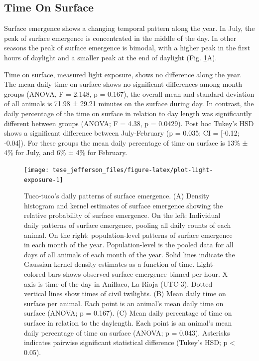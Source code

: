\documentclass[msc,numbers,hidelinks]{coppe}
\begin{document}
  \hypertarget{time-on-surface}{%
  \subsection{Time On Surface}\label{time-on-surface}}

  Surface emergence shows a changing temporal pattern along the year. In July, the peak of surface emergence is concentrated in the middle of the day. In other seasons the peak of surface emergence is bimodal, with a higher peak in the first hours of daylight and a smaller peak at the end of daylight (Fig. \ref{fig:plot-light-exposure}A).

  Time on surface, measured light exposure, shows no difference along the year. The mean daily time on surface shows no significant differences among month groups (ANOVA, F = 2.148, p = 0.167), the overall mean and standard deviation of all animals is 71.98 ± 29.21 minutes on the surface during day. In contrast, the daily percentage of the time on surface in relation to day length was significantly different between groups (ANOVA; F = 4.38, p = 0.0429). Post hoc Tukey's HSD shows a significant difference between July-February (p = 0.035; CI = {[}-0.12; -0.04{]}). For these groups the mean daily percentage of time on surface is 13\% ± 4\% for July, and 6\% ± 4\% for February.\newline
  \begin{figure}[H]

  {\centering \texttt{[image: tese\_jefferson\_files/figure-latex/plot-light-exposure-1]} 

  }

  \caption{Tuco-tuco’s daily patterns of surface emergence. (A) Density histogram and kernel estimates of surface emergence showing the relative probability of surface emergence. On the left: Individual daily patterns of surface emergence, pooling all daily counts of each animal. On the right: population-level patterns of surface emergence in each month of the year. Population-level is the pooled data for all days of all animals of each month of the year. Solid lines indicate the Gaussian kernel density estimates as a function of time. Light-colored bars shows observed surface emergence binned per hour. X-axis is time of the day in Anillaco, La Rioja (UTC-3). Dotted vertical lines show times of civil twilights. (B) Mean daily time on surface per animal. Each point is an animal’s mean daily time on surface (ANOVA; p = 0.167). (C) Mean daily percentage of time on surface in relation to the daylength. Each point is an animal’s mean daily percentage of time on surface (ANOVA; p = 0.043). Asterisks indicates pairwise significant statistical difference (Tukey’s HSD; p < 0.05).}\label{fig:plot-light-exposure}
  \end{figure}
  \clearpage
\end{document}
